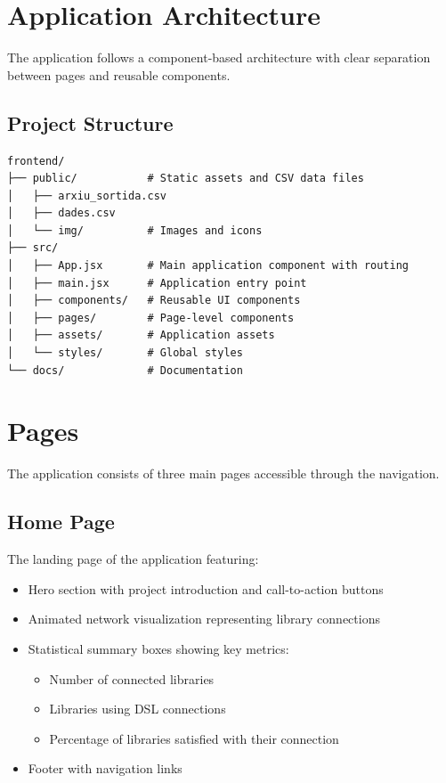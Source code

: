 \documentclass[11pt,a4paper]{article}
\begin{document}
\section{Application Architecture}

The application follows a component-based architecture with clear separation between pages and reusable components.

\subsection{Project Structure}

\begin{verbatim}
frontend/
├── public/           # Static assets and CSV data files
│   ├── arxiu_sortida.csv
│   ├── dades.csv
│   └── img/          # Images and icons
├── src/
│   ├── App.jsx       # Main application component with routing
│   ├── main.jsx      # Application entry point
│   ├── components/   # Reusable UI components
│   ├── pages/        # Page-level components
│   ├── assets/       # Application assets
│   └── styles/       # Global styles
└── docs/             # Documentation
\end{verbatim}

\section{Pages}

The application consists of three main pages accessible through the navigation.

\subsection{Home Page}

The landing page of the application featuring:
\begin{itemize}
    \item Hero section with project introduction and call-to-action buttons
    \item Animated network visualization representing library connections
    \item Statistical summary boxes showing key metrics:
    \begin{itemize}
        \item Number of connected libraries
        \item Libraries using DSL connections
        \item Percentage of libraries satisfied with their connection
    \end{itemize}
    \item Footer with navigation links
\end{itemize}
\end{document}
